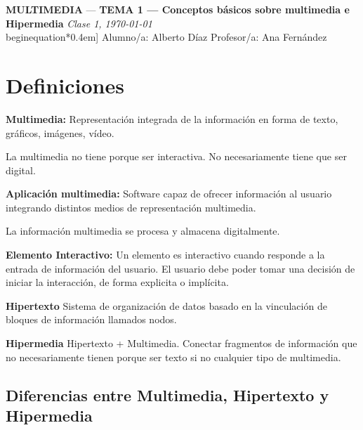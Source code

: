 \documentclass[11pt,a4paper]{article}
\newcommand{\asignatura}{MULTIMEDIA}
\newcommand{\tema}{TEMA 1 — Conceptos básicos sobre multimedia e Hipermedia}  %
\newcommand{\clase}{Clase 1}
\newcommand{\fecha}{\today}                              %
\begin{document}
	{\large \textbf{\asignatura} \;—\; \textbf{\tema} \hfill \textit{\clase, \fecha}}\\begin{equation*}0.4em]
	\faUser\; Alumno/a: Alberto Díaz\hfill
	\faChalkboardTeacher\; Profesor/a: Ana Fernández

	\vspace{0.6em}

	\tableofcontents

	\section{Definiciones}
	\begin{DefBox}
		\textbf{Multimedia:} Representación integrada de la información en forma de texto, gráficos, imágenes, vídeo.

		La multimedia no tiene porque ser interactiva. No necesariamente tiene que ser digital.
	\end{DefBox}



	\begin{DefBox}
		\textbf{Aplicación multimedia:} Software capaz de ofrecer información al usuario integrando distintos medios de representación multimedia.

		La información multimedia se procesa y almacena digitalmente.
	\end{DefBox}

	\begin{DefBox}
		\textbf{Elemento Interactivo: } Un elemento es interactivo cuando responde a la entrada de información del usuario. El usuario debe poder tomar una decisión de iniciar la interacción, de forma explicita o implícita.
	\end{DefBox}

	\begin{DefBox}
		\textbf{Hipertexto} Sistema de organización de datos basado en la vinculación de bloques de información llamados nodos.
	\end{DefBox}

	\begin{DefBox}
		\textbf{Hipermedia} Hipertexto + Multimedia. Conectar fragmentos de información que no necesariamente tienen porque ser texto si no cualquier tipo de multimedia.
	\end{DefBox}

	\subsection{Diferencias entre Multimedia, Hipertexto y Hipermedia}
\end{document}
